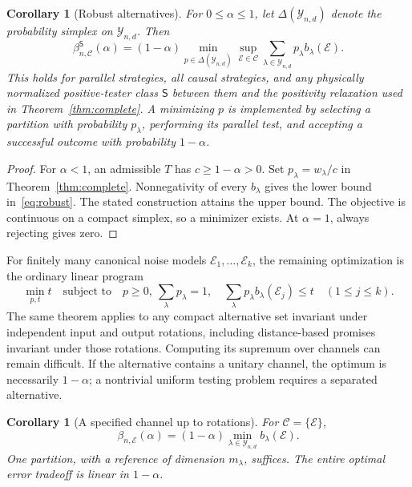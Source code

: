 \documentclass[11pt,a4paper]{article}
\newtheorem{corollary}[theorem]{Corollary}
\theoremstyle{remark}\newtheorem{remark}[theorem]{Remark}
\newcommand{\cE}{\mathcal E}
\newcommand{\cC}{\mathcal C}
\newcommand{\cY}{\mathcal Y_{n,d}}
\begin{document}
\begin{corollary}[Robust alternatives]\label{cor:robust}
For $0\leq\alpha\leq1$, let $\Delta(\cY)$ denote the probability simplex on $\cY$. Then
\begin{equation}\boxed{\displaystyle
 \beta^{\mathsf S}_{n,\cC}(\alpha)
 =(1-\alpha)\min_{p\in\Delta(\cY)}
 \sup_{\cE\in\cC}\sum_{\lambda\in\cY}p_\lambda b_\lambda(\cE).}\label{eq:robust}
\end{equation}
This holds for parallel strategies, all causal strategies, and any physically normalized positive-tester class $\mathsf S$ between them and the positivity relaxation used in Theorem~\ref{thm:complete}. A minimizing $p$ is implemented by selecting a partition with probability $p_\lambda$, performing its parallel test, and accepting a successful outcome with probability $1-\alpha$.
\end{corollary}
\begin{proof}
For $\alpha<1$, an admissible $T$ has $c\geq1-\alpha>0$. Set $p_\lambda=w_\lambda/c$ in Theorem~\ref{thm:complete}. Nonnegativity of every $b_\lambda$ gives the lower bound in~\eqref{eq:robust}. The stated construction attains the upper bound. The objective is continuous on a compact simplex, so a minimizer exists. At $\alpha=1$, always rejecting gives zero.
\end{proof}

For finitely many canonical noise models $\cE_1,\ldots,\cE_k$, the remaining optimization is the ordinary linear program
\begin{equation}
 \min_{p,t}t\quad\text{subject to}\quad
 p\geq0,\ \sum_\lambda p_\lambda=1,\quad
 \sum_\lambda p_\lambda b_\lambda(\cE_j)\leq t\quad(1\leq j\leq k).
\end{equation}
The same theorem applies to any compact alternative set invariant under independent input and output rotations, including distance-based promises invariant under those rotations. Computing its supremum over channels can remain difficult. If the alternative contains a unitary channel, the optimum is necessarily $1-\alpha$; a nontrivial uniform testing problem requires a separated alternative.

\begin{corollary}[A specified channel up to rotations]\label{cor:single}
For $\cC=\{\cE\}$,
\begin{equation}\boxed{\displaystyle
 \beta_{n,\cE}(\alpha)=(1-\alpha)\min_{\lambda\in\cY}b_\lambda(\cE).}\label{eq:main}
\end{equation}
One partition, with a reference of dimension $m_\lambda$, suffices. The entire optimal error tradeoff is linear in $1-\alpha$.
\end{corollary}
\end{document}
